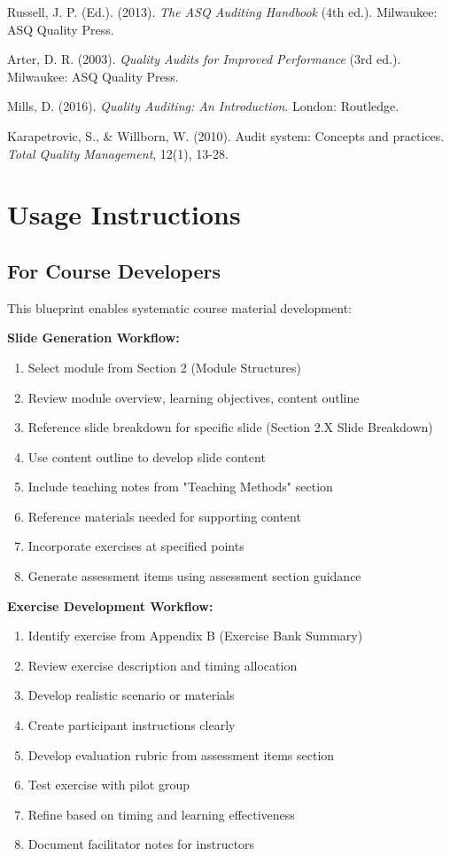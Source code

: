 \documentclass[11pt,a4paper]{article}
\begin{document}
\begin{thebibliography}{99}

Russell, J. P. (Ed.). (2013). \textit{The ASQ Auditing Handbook} (4th ed.). Milwaukee: ASQ Quality Press.

Arter, D. R. (2003). \textit{Quality Audits for Improved Performance} (3rd ed.). Milwaukee: ASQ Quality Press.

Mills, D. (2016). \textit{Quality Auditing: An Introduction}. London: Routledge.

Karapetrovic, S., \& Willborn, W. (2010). Audit system: Concepts and practices. \textit{Total Quality Management}, 12(1), 13-28.

\end{thebibliography}

\section{Usage Instructions}

\subsection{For Course Developers}

This blueprint enables systematic course material development:

\textbf{Slide Generation Workflow:}
\begin{enumerate}
\item Select module from Section 2 (Module Structures)
\item Review module overview, learning objectives, content outline
\item Reference slide breakdown for specific slide (Section 2.X Slide Breakdown)
\item Use content outline to develop slide content
\item Include teaching notes from "Teaching Methods" section
\item Reference materials needed for supporting content
\item Incorporate exercises at specified points
\item Generate assessment items using assessment section guidance
\end{enumerate}

\textbf{Exercise Development Workflow:}
\begin{enumerate}
\item Identify exercise from Appendix B (Exercise Bank Summary)
\item Review exercise description and timing allocation
\item Develop realistic scenario or materials
\item Create participant instructions clearly
\item Develop evaluation rubric from assessment items section
\item Test exercise with pilot group
\item Refine based on timing and learning effectiveness
\item Document facilitator notes for instructors
\end{enumerate}
\end{document}
